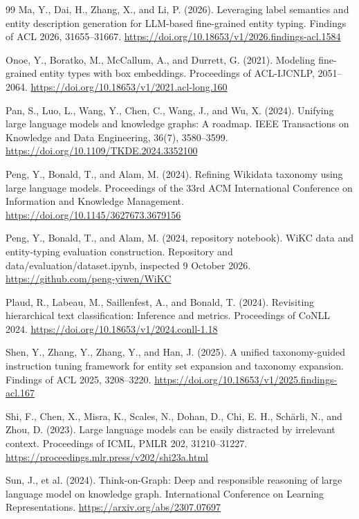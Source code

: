 \begin{thebibliography}{99}
Ma, Y., Dai, H., Zhang, X., and Li, P. (2026). Leveraging label semantics and entity description generation for LLM-based fine-grained entity typing. Findings of ACL 2026, 31655–31667. \url{https://doi.org/10.18653/v1/2026.findings-acl.1584}

Onoe, Y., Boratko, M., McCallum, A., and Durrett, G. (2021). Modeling fine-grained entity types with box embeddings. Proceedings of ACL-IJCNLP, 2051–2064. \url{https://doi.org/10.18653/v1/2021.acl-long.160}

Pan, S., Luo, L., Wang, Y., Chen, C., Wang, J., and Wu, X. (2024). Unifying large language models and knowledge graphs: A roadmap. IEEE Transactions on Knowledge and Data Engineering, 36(7), 3580–3599. \url{https://doi.org/10.1109/TKDE.2024.3352100}

Peng, Y., Bonald, T., and Alam, M. (2024). Refining Wikidata taxonomy using large language models. Proceedings of the 33rd ACM International Conference on Information and Knowledge Management. \url{https://doi.org/10.1145/3627673.3679156}

Peng, Y., Bonald, T., and Alam, M. (2024, repository notebook). WiKC data and entity-typing evaluation construction. Repository and data/evaluation/dataset.ipynb, inspected 9 October 2026. \url{https://github.com/peng-yiwen/WiKC}

Plaud, R., Labeau, M., Saillenfest, A., and Bonald, T. (2024). Revisiting hierarchical text classification: Inference and metrics. Proceedings of CoNLL 2024. \url{https://doi.org/10.18653/v1/2024.conll-1.18}

Shen, Y., Zhang, Y., Zhang, Y., and Han, J. (2025). A unified taxonomy-guided instruction tuning framework for entity set expansion and taxonomy expansion. Findings of ACL 2025, 3208–3220. \url{https://doi.org/10.18653/v1/2025.findings-acl.167}

Shi, F., Chen, X., Misra, K., Scales, N., Dohan, D., Chi, E. H., Schärli, N., and Zhou, D. (2023). Large language models can be easily distracted by irrelevant context. Proceedings of ICML, PMLR 202, 31210–31227. \url{https://proceedings.mlr.press/v202/shi23a.html}

Sun, J., et al. (2024). Think-on-Graph: Deep and responsible reasoning of large language model on knowledge graph. International Conference on Learning Representations. \url{https://arxiv.org/abs/2307.07697}


\end{thebibliography}
